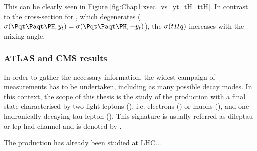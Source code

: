 This can be clearly seen in Figure \ref{fig:Chap1:xsec_vs_yt_tH_ttH}. 
In contrast to the cross-section for \ttH, which degenerates ($\sigma(\ttH, \yt) = \sigma(\ttH, -\yt)$),
the $\sigma(tHq)$ increases with the \CP-mixing angle.




\subsubsection{ATLAS and CMS results}


In order to gather the necessary information, the widest campaign of measurements has to 
be undertaken, including as many possible decay modes. 
In this context, the scope of this thesis is the study of the production \tH with a final state 
characterised by two light leptons (\Plepton), i.e. electrons (\Pepm) or muons (\Pmupm), and one
hadronically decaying tau lepton (\tauhad). This signature is usually referred as dileptau or lep-had 
channel and is denoted by \dileptau.

The \tHq production has already been studied at LHC... 


\begin{comment}






\end{comment}
